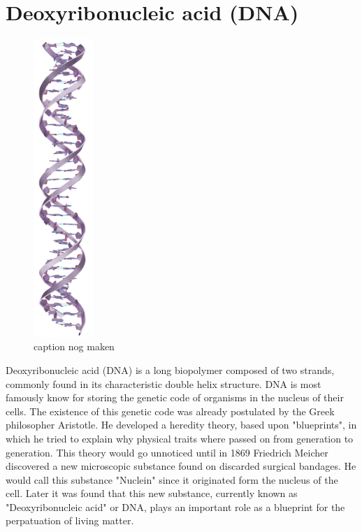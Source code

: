 \section{Deoxyribonucleic acid (DNA)}

\begin{figure}
  \begin{center}
    \includegraphics[width=0.20\textwidth]{Figures/DNAStrand.png}
  \end{center}
  \caption{caption nog maken}
\end{figure}

Deoxyribonucleic acid (DNA) is a long biopolymer composed of two strands, commonly found
in its characteristic double helix structure. DNA is most famously know for storing the
genetic code of organisms in the nucleus of their cells. The existence of this genetic
code was already
postulated by the Greek philosopher Aristotle. He developed a heredity theory, based
upon "blueprints", in which he tried to explain why physical traits where passed on from
generation to generation. This theory would go unnoticed until in 1869
Friedrich Meicher discovered a new microscopic substance found on discarded
surgical bandages. He would call this substance "Nuclein" since it originated
form the nucleus of the cell. Later it was found that this new substance, currently known
as "Deoxyribonucleic acid" or DNA, plays an important role as a blueprint for the
perpatuation of living matter.

